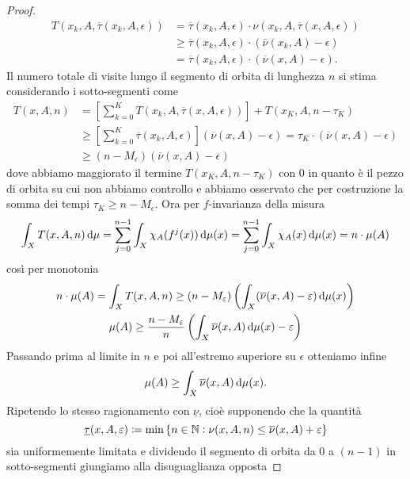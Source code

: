 \begin{proof}
    \begin{align*}
        T(x_k, A, \overline{\tau}(x_k, A, \epsilon)) & = \overline{\tau}(x_k, A, \epsilon) \cdot \nu(x_k, A, \overline{\tau}(x, A , \epsilon)) \\
        & \geq \overline{\tau}(x_k, A, \epsilon) \cdot (\overline{\nu}(x_k, A) - \epsilon) \\
        & = \overline{\tau}(x_k, A, \epsilon) \cdot (\overline{\nu}(x, A) - \epsilon).
    \end{align*}
    Il numero totale di visite lungo il segmento di orbita di lunghezza $ n $ si stima considerando i sotto-segmenti come
    \begin{align*}
        T(x, A, n) & = \left[\sum_{k = 0}^{K} T(x_k, A, \overline{\tau}(x, A, \epsilon))\right] + T(x_{K}, A, n - \tau_{K}) \\
        & \geq \left[\sum_{k = 0}^{K}  \overline{\tau}(x_k, A, \epsilon)\right] (\overline{\nu}(x, A) - \epsilon) = \tau_{K} \cdot (\overline{\nu}(x, A) - \epsilon) \\
        & \geq (n - M_\epsilon)(\overline{\nu}(x, A) - \epsilon)
    \end{align*}
    dove abbiamo maggiorato il termine $ T(x_{K}, A, n - \tau_{K}) $ con $ 0 $ in quanto è il pezzo di orbita su cui non abbiamo controllo e abbiamo osservato che per costruzione la somma dei tempi $ \tau_K \geq n - M_{\epsilon} $. Ora per $ f $-invarianza della misura
    \[
        \int_{X} T(x, A, n) \dif{\mu} = \sum_{j = 0}^{n-1} \int_{X} \chi_A(f^{j}(x)) \dif{\mu}(x) = \sum_{j = 0}^{n-1} \int_{X} \chi_A(x) \dif{\mu}(x) = n \cdot \mu(A)
    \]
    così per monotonia
    \begin{gather*}
        n \cdot \mu(A) = \int_{X} T(x, A, n) \geq (n - M_\epsilon) \left(\int_{X}(\overline{\nu}(x, A) - \epsilon) \dif{\mu}(x)\right) \\
        \mu(A) \geq \frac{n - M_\epsilon}{n} \left(\int_{X}\overline{\nu}(x, A) \dif{\mu}(x) - \epsilon\right)
    \end{gather*}
    Passando prima al limite in $ n $ e poi all'estremo superiore su $ \epsilon $ otteniamo infine
    \[
        \mu(A) \geq \int_{X}\overline{\nu}(x, A) \dif{\mu}(x).
    \]
    Ripetendo lo stesso ragionamento con $ \underline{\nu} $, cioè supponendo che la quantità
    \[
        \underline{\tau}(x, A, \varepsilon) \coloneqq \min{\{n \in \mathbb{N}: \nu(x, A, n) \leq \overline{\nu}(x, A) + \varepsilon\}}
    \]
    sia uniformemente limitata e dividendo il segmento di orbita da $ 0 $ a $ (n-1) $ in sotto-segmenti giungiamo alla disuguaglianza opposta

\end{proof}

